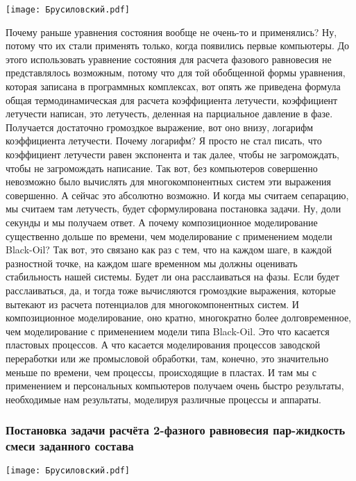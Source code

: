 \documentclass[main.tex]{subfiles}
\begin{document}
\begin{center}
\texttt{[image: Брусиловский.pdf]}
\end{center}

Почему раньше уравнения состояния вообще не очень-то и применялись?
Ну, потому что их стали применять только, когда появились первые компьютеры.
До этого использовать уравнение состояния для расчета фазового равновесия не представлялось возможным, потому что для той обобщенной формы уравнения, которая записана в программных комплексах, вот опять же приведена формула общая термодинамическая для расчета коэффициента летучести, коэффициент летучести написан, это летучесть, деленная на парциальное давление в фазе.
Получается достаточно громоздкое выражение, вот оно внизу, логарифм коэффициента летучести.
Почему логарифм?
Я просто не стал писать, что коэффициент летучести равен экспонента и так далее, чтобы не загромождать, чтобы не загромождать написание.
Так вот, без компьютеров совершенно невозможно было вычислять для многокомпонентных систем эти выражения совершенно.
А сейчас это абсолютно возможно.
И когда мы считаем сепарацию, мы считаем там летучесть, будет сформулирована постановка задачи.
Ну, доли секунды и мы получаем ответ.
А почему композиционное моделирование существенно дольше по времени, чем моделирование с применением модели Black-Oil?
Так вот, это связано как раз с тем, что на каждом шаге, в каждой разностной точке, на каждом шаге временном мы должны оценивать стабильность нашей системы.
Будет ли она расслаиваться на фазы.
Если будет расслаиваться, да, и тогда тоже вычисляются громоздкие выражения, которые вытекают из расчета потенциалов для многокомпонентных систем.
И композиционное моделирование, оно кратно, многократно более долговременное, чем моделирование с применением модели типа Black-Oil.
Это что касается пластовых процессов.
А что касается моделирования процессов заводской переработки или же промысловой обработки, там, конечно, это значительно меньше по времени, чем процессы, происходящие в пластах.
И там мы с применением и персональных компьютеров получаем очень быстро результаты, необходимые нам результаты, моделируя различные процессы и аппараты.

\subsubsection{Постановка задачи расчёта 2-фазного равновесия пар-жидкость смеси заданного состава}

\begin{center}
\texttt{[image: Брусиловский.pdf]}
\end{center}
\end{document}
